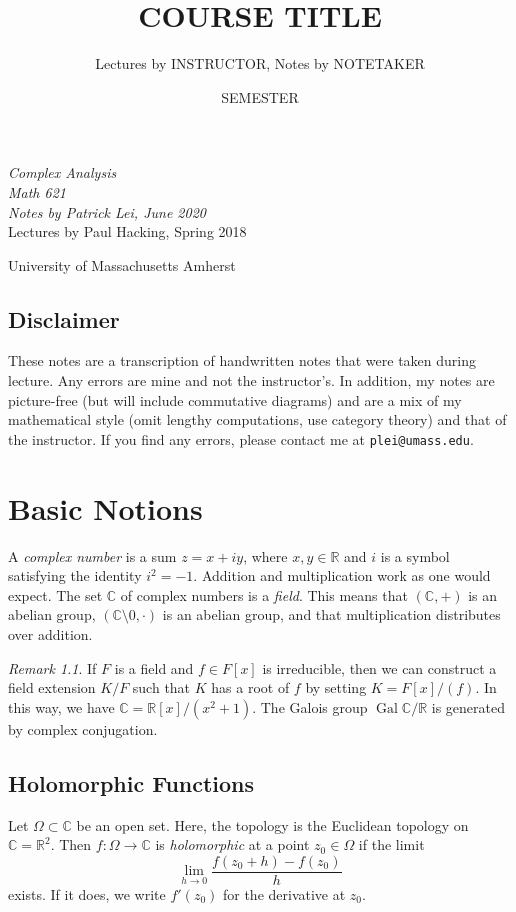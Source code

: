 \documentclass[leqno, openany]{memoir}
\title{COURSE TITLE}
\author{Lectures by INSTRUCTOR, Notes by NOTETAKER}
\date{SEMESTER}
\theoremstyle{definition}
\theoremstyle{remark}
\newtheorem{rmk}[thm]{Remark}
\theoremstyle{plain}
\theoremstyle{definition}
\theoremstyle{remark}
\newcommand{\R}{\mathbb{R}}
\newcommand{\C}{\mathbb{C}}
\newcommand*{\titleSW}
    {\begingroup%
    \raggedleft
    \vspace*{\baselineskip}
    {\Huge\itshape Complex Analysis \\ Math 621}\\[\baselineskip]
    {\large\itshape Notes by Patrick Lei,
                    June 2020}\\[0.2\textheight]
    {\Large Lectures by Paul Hacking, Spring 2018}\par
    \vfill
    {\Large \sffamily University of Massachusetts Amherst}
    \vspace*{\baselineskip}
\endgroup}
\begin{document}
    
\begin{titlingpage}
\titleSW
\end{titlingpage}

\thispagestyle{empty}
\section*{Disclaimer}%
\label{sec:disclaimer}

These notes are a transcription of handwritten notes that were taken during
lecture.  Any errors are mine and not the instructor's.  In addition, my notes
are picture-free (but will include commutative diagrams) and are a mix of my
mathematical style (omit lengthy computations, use category theory) and that of
the instructor.  If you find any errors, please contact me at
\texttt{plei@umass.edu}.  \newpage

\tableofcontents

\chapter{Basic Notions}%

A \textit{complex number} is a sum $z = x + iy$, where $x,y \in \R$ and $i$ is
a symbol satisfying the identity $i^2 = -1$. Addition and multiplication work
as one would expect. The set $\C$ of complex numbers is a \textit{field}. This
means that $(\C,+)$ is an abelian group, $(\C \setminus \qty{0}, \cdot)$ is an
abelian group, and that multiplication distributes over addition.

\begin{rmk} If $F$ is a field and $f \in F[x]$ is irreducible, then we can
    construct a field extension $K/F$ such that $K$ has a root of $f$ by
    setting $K = F[x]/(f)$. In this way, we have $\C = \R[x] / (x^2 + 1)$. The
    Galois group $\operatorname{Gal} \C/\R$ is generated by complex
    conjugation.  \end{rmk}

\section{Holomorphic Functions}%

Let $\Omega \subset \C$ be an open set. Here, the topology is the Euclidean
topology on $\C = \R^2$. Then $f: \Omega \to \C$ is \textit{holomorphic} at a
point $z_0 \in \Omega$ if the limit \[ \lim_{h \to 0} \frac{f(z_0+h) -
f(z_0)}{h} \] exists. If it does, we write $f'(z_0)$ for the derivative at
$z_0$.
\end{document}
